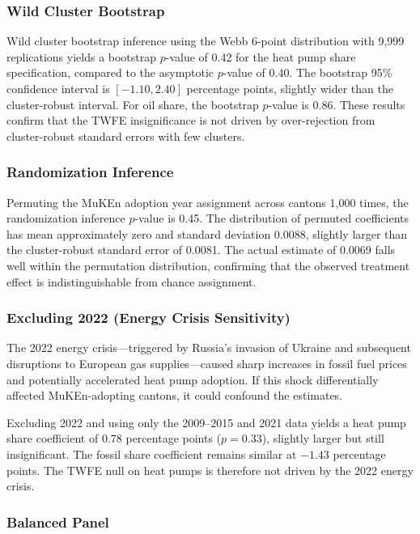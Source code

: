 \documentclass[12pt]{article}
\begin{document}
\subsubsection{Wild Cluster Bootstrap}

Wild cluster bootstrap inference using the Webb 6-point distribution with 9,999 replications yields a bootstrap $p$-value of 0.42 for the heat pump share specification, compared to the asymptotic $p$-value of 0.40. The bootstrap 95\% confidence interval is $[-1.10, 2.40]$ percentage points, slightly wider than the cluster-robust interval. For oil share, the bootstrap $p$-value is 0.86. These results confirm that the TWFE insignificance is not driven by over-rejection from cluster-robust standard errors with few clusters.

\subsubsection{Randomization Inference}

Permuting the MuKEn adoption year assignment across cantons 1,000 times, the randomization inference $p$-value is 0.45. The distribution of permuted coefficients has mean approximately zero and standard deviation 0.0088, slightly larger than the cluster-robust standard error of 0.0081. The actual estimate of 0.0069 falls well within the permutation distribution, confirming that the observed treatment effect is indistinguishable from chance assignment.

\subsubsection{Excluding 2022 (Energy Crisis Sensitivity)}

The 2022 energy crisis---triggered by Russia's invasion of Ukraine and subsequent disruptions to European gas supplies---caused sharp increases in fossil fuel prices and potentially accelerated heat pump adoption. If this shock differentially affected MuKEn-adopting cantons, it could confound the estimates.

Excluding 2022 and using only the 2009--2015 and 2021 data yields a heat pump share coefficient of 0.78 percentage points ($p = 0.33$), slightly larger but still insignificant. The fossil share coefficient remains similar at $-1.43$ percentage points. The TWFE null on heat pumps is therefore not driven by the 2022 energy crisis.

\subsubsection{Balanced Panel}
\end{document}
